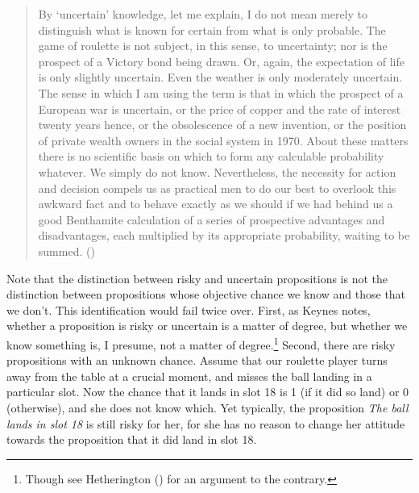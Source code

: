 \documentclass[
  11pt,
  letterpaper,
  DIV=11,
  numbers=noendperiod,
  twoside]{scrartcl}
\begin{document}
\begin{quote}
By `uncertain' knowledge, let me explain, I do not mean merely to
distinguish what is known for certain from what is only probable. The
game of roulette is not subject, in this sense, to uncertainty; nor is
the prospect of a Victory bond being drawn. Or, again, the expectation
of life is only slightly uncertain. Even the weather is only moderately
uncertain. The sense in which I am using the term is that in which the
prospect of a European war is uncertain, or the price of copper and the
rate of interest twenty years hence, or the obsolescence of a new
invention, or the position of private wealth owners in the social system
in 1970. About these matters there is no scientific basis on which to
form any calculable probability whatever. We simply do not know.
Nevertheless, the necessity for action and decision compels us as
practical men to do our best to overlook this awkward fact and to behave
exactly as we should if we had behind us a good Benthamite calculation
of a series of prospective advantages and disadvantages, each multiplied
by its appropriate probability, waiting to be summed.
()
\end{quote}

Note that the distinction between risky and uncertain propositions is
not the distinction between propositions whose objective chance we know
and those that we don't. This identification would fail twice over.
First, as Keynes notes, whether a proposition is risky or uncertain is a
matter of degree, but whether we know something is, I presume, not a
matter of degree.\footnote{Though see Hetherington
  () for an argument to the
  contrary.} Second, there are risky propositions with an unknown
chance. Assume that our roulette player turns away from the table at a
crucial moment, and misses the ball landing in a particular slot. Now
the chance that it lands in slot 18 is 1 (if it did so land) or 0
(otherwise), and she does not know which. Yet typically, the proposition
\emph{The ball lands in slot 18} is still risky for her, for she has no
reason to change her attitude towards the proposition that it did land
in slot 18.
\end{document}
